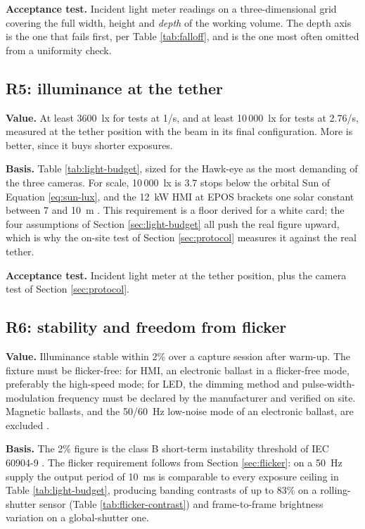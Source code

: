 \textbf{Acceptance test.} Incident light meter readings on a three-dimensional grid covering the full width, height and \emph{depth} of the working volume. The depth axis is the one that fails first, per Table \ref{tab:falloff}, and is the one most often omitted from a uniformity check.

\subsection{R5: illuminance at the tether}
\label{sec:r5}

\textbf{Value.} At least 3600~lx for tests at 1\textdegree/s, and at least 10\,000~lx for tests at 2.76\textdegree/s, measured at the tether position with the beam in its final configuration. More is better, since it buys shorter exposures.

\textbf{Basis.} Table \ref{tab:light-budget}, sized for the Hawk-eye as the most demanding of the three cameras. For scale, 10\,000~lx is 3.7 stops below the orbital Sun of Equation \ref{eq:sun-lux}, and the 12~kW HMI at EPOS brackets one solar constant between 7 and 10~m \cite{dlr2025eposportfolio}. This requirement is a floor derived for a white card; the four assumptions of Section \ref{sec:light-budget} all push the real figure upward, which is why the on-site test of Section \ref{sec:protocol} measures it against the real tether.

\textbf{Acceptance test.} Incident light meter at the tether position, plus the camera test of Section \ref{sec:protocol}.

\subsection{R6: stability and freedom from flicker}
\label{sec:r6}

\textbf{Value.} Illuminance stable within 2\% over a capture session after warm-up. The fixture must be flicker-free: for HMI, an electronic ballast in a flicker-free mode, preferably the high-speed mode; for LED, the dimming method and pulse-width-modulation frequency must be declared by the manufacturer and verified on site. Magnetic ballasts, and the 50/60~Hz low-noise mode of an electronic ballast, are excluded \cite{arri_eb1218_manual}.

\textbf{Basis.} The 2\% figure is the class B short-term instability threshold of IEC 60904-9 \cite{iec60904_9_2020}. The flicker requirement follows from Section \ref{sec:flicker}: on a 50~Hz supply the output period of 10~ms is comparable to every exposure ceiling in Table \ref{tab:light-budget}, producing banding contrasts of up to 83\% on a rolling-shutter sensor (Table \ref{tab:flicker-contrast}) and frame-to-frame brightness variation on a global-shutter one.

